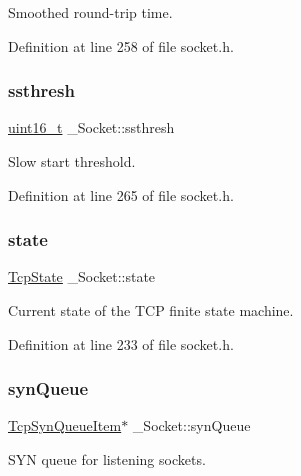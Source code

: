 Smoothed round-\/trip time. 



Definition at line 258 of file socket.\+h.

\mbox{\label{struct__Socket_ae6c17dc60d0ba6337b7a98a9244f06d5}} 
\subsubsection{\texorpdfstring{ssthresh}{ssthresh}}
{\footnotesize\ttfamily \hyperlink{stdint_8h_a273cf69d639a59973b6019625df33e30}{uint16\+\_\+t} \+\_\+\+Socket\+::ssthresh}



Slow start threshold. 



Definition at line 265 of file socket.\+h.

\mbox{\label{struct__Socket_a8985a20d225bf416709ce904e956ca46}} 
\subsubsection{\texorpdfstring{state}{state}}
{\footnotesize\ttfamily \hyperlink{tcp_8h_a4310b47e70de394d33f7cf601e35bfec}{Tcp\+State} \+\_\+\+Socket\+::state}



Current state of the T\+CP finite state machine. 



Definition at line 233 of file socket.\+h.

\mbox{\label{struct__Socket_a8d6a6d8db31df012cf49443c421865a8}} 
\subsubsection{\texorpdfstring{syn\+Queue}{synQueue}}
{\footnotesize\ttfamily \hyperlink{tcp_8h_a933e3439a35c2a8994d9de8f460cc5b1}{Tcp\+Syn\+Queue\+Item}$\ast$ \+\_\+\+Socket\+::syn\+Queue}



S\+YN queue for listening sockets. 



